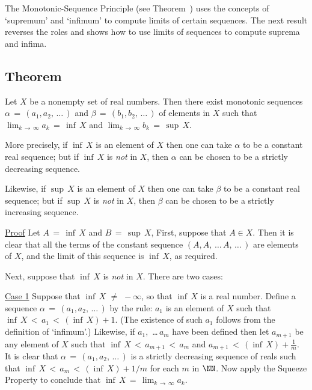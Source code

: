 \VV


        The Monotonic-Sequence Principle (see Theorem~) uses the concepts of `supremum' and `infimum' to compute limits of certain sequences.
    The next result reverses the roles and shows how to use limits of sequences to compute suprema and infima.

\V


            \subsection{\small{\bf Theorem}}
            \label{ThmC50.10}

        Let $X$ be a nonempty set of real numbers. Then there exist monotonic sequences ${\alpha} \,=\, (a_{1},a_{2},\,{\ldots}\,)$ and ${\beta} \,=\, (b_{1},b_{2},\,{\ldots}\,)$ of elements in $X$ such that $\lim_{k \,{\rightarrow}\, {\infty}} a_{k} \,=\, {\inf}\,X$ and $\lim_{k \,{\rightarrow}\, {\infty}} b_{k} \,=\, {\sup}\,X$.

        More precisely, if ${\inf}\,X$ is an element of $X$ then one can take ${\alpha}$ to be a constant real sequence;
    but if ${\inf}\,X$ is {\em not} in $X$, then ${\alpha}$ can be chosen to be a strictly decreasing sequence.

        Likewise, if ${\sup}\,X$ is an element of $X$ then one can take ${\beta}$ to be a constant real sequence;
    but if ${\sup}\,X$ is {\em not} in $X$, then ${\beta}$ can be chosen to be a strictly increasing sequence.

\V

        \underline{Proof} Let $A \,=\, {\inf}\,X$ and $B \,=\, {\sup}\,X$, 
    First, suppose that $A{\in}X$. Then it is clear that all the terms of the constant sequence
    $(A, A,\,{\ldots}\,A,\,{\ldots}\,)$ are elements of $X$, and the limit of this sequence is ${\inf}\,X$, as required.

        Next, suppose that ${\inf}\,X$ is {\em not} in $X$.
    There are two cases:

        \underline{Case 1} Suppose that ${\inf}\,X \,\,{\neq}\,\, -{\infty}$, so that ${\inf}\,X$ is a real number.
    Define a sequence ${\alpha} \,=\, (a_{1},a_{2},\,{\ldots}\,)$ by the rule:
        $a_{1}$ is an element of $X$ such that ${\inf}\,X\,<\,a_{1}\,<\,({\inf}\,X) + 1$.
    (The existence of such $a_{1}$ follows from the definition of `infimum'.)
    Likewise, if $a_{1}$, \,{\ldots}$\,a_{m}$ have been defined then let $a_{m+1}$ be any element of $X$ such that ${\inf}\,X\,<\,a_{m+1}\,<\,a_{m}$ and ${\displaystyle a_{m+1}\,<\,({\inf}\,X) + \frac{1}{m}}$.
    It is clear that ${\alpha} \,=\, (a_{1},a_{2},\,{\ldots}\,)$ is a strictly decreasing sequence of reals such that ${\inf}\,X\,<\,a_{m}\,<\,({\inf}\,X) + 1/m$ for each $m$ in ${\NN}$.
    Now apply the Squeeze Property to conclude that ${\inf}\,X \,=\, \lim_{k \,{\rightarrow}\, {\infty}} a_{k}$.

